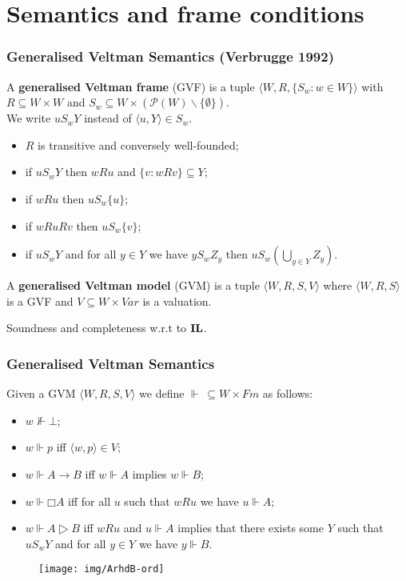 \documentclass[xcolor={x11names}]{beamer}
\newcommand{\prin}[1]{\ensuremath{\textbf{\textup{#1}}}\xspace}
\newcommand{\il}{\prin{IL}}
\begin{document}
\section{Semantics and frame conditions}
\begin{frame}
  \frametitle{Generalised Veltman Semantics (Verbrugge 1992)}
  A \textbf{generalised Veltman frame} (GVF) is a tuple $⟨W,R,\{S_w:w∈W\}⟩$ with
  $R⊆W×W$ and $S_w⊆W×(𝒫(W)∖\{∅\})$.\\ We write $uS_wY$ instead of $⟨u,Y⟩∈S_w$.
  \begin{itemize}
    \item $R$ is transitive and conversely well-founded;
    \item if $uS_wY$ then $wRu$ and $\{v:wRv\}⊆Y$;
    \item if $wRu$ then $uS_w\{u\}$;
    \item if $wRuRv$ then $uS_w\{v\}$;
    \item if $uS_wY$ and for all $y∈Y$ we have $yS_wZ_y$ then $uS_w\left(⋃_{y∈Y}Z_y\right)$.
  \end{itemize}

  \pause
  \vspace{0.3cm}
  A \textbf{generalised Veltman model} (GVM) is a tuple $⟨W,R,S,V⟩$ where
  $⟨W,R,S⟩$ is a GVF and $V⊆W×Var$ is a valuation.

  \vspace{0.2cm}
  Soundness and completeness w.r.t to \il.
\end{frame}

\begin{frame}
  \frametitle{Generalised Veltman Semantics}
  Given a GVM $⟨W,R,S,V⟩$ we define $⊩\ ⊆W×Fm$ as follows:
  \begin{itemize}
    \item $w⊮⊥$;
    \item $w⊩p$ iff $⟨w,p⟩∈V$;
    \item $w⊩A→B$ iff $w⊩A$ implies $w⊩B$;
    \item $w⊩□A$ iff for all $u$ such that $wRu$ we have $u⊩A$;
      \pause
    \item $w⊩A▷B$ iff $wRu$ and $u⊩A$ implies that there exists some $Y$ such
      that $uS_wY$ and for all $y∈Y$ we have $y⊩B$.
  \end{itemize}
  \begin{figure}[t]
    \texttt{[image: img/ArhdB-ord]}
    \centering
  \end{figure}
\end{frame}
\end{document}
